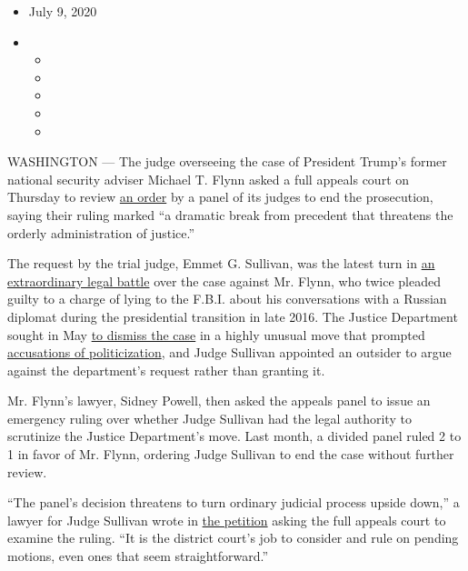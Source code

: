 \begin{itemize}
\item
  July 9, 2020
\item
  \begin{itemize}
  \item
  \item
  \item
  \item
  \item
  \end{itemize}
\end{itemize}

WASHINGTON --- The judge overseeing the case of President Trump's former
national security adviser Michael T. Flynn asked a full appeals court on
Thursday to review
\href{https://www.nytimes.com/2020/06/24/us/politics/michael-flynn-appeals-court.html}{an
order} by a panel of its judges to end the prosecution, saying their
ruling marked ``a dramatic break from precedent that threatens the
orderly administration of justice.''

The request by the trial judge, Emmet G. Sullivan, was the latest turn
in
\href{https://www.nytimes.com/2020/06/28/us/politics/michael-flynn-sidney-powell.html}{an
extraordinary legal battle} over the case against Mr. Flynn, who twice
pleaded guilty to a charge of lying to the F.B.I. about his
conversations with a Russian diplomat during the presidential transition
in late 2016. The Justice Department sought in May
\href{https://www.nytimes.com/2020/05/07/us/politics/michael-flynn-case-dropped.html}{to
dismiss the case} in a highly unusual move that prompted
\href{https://www.nytimes.com/2020/05/08/us/politics/barr-flynn-case-justice-department.html}{accusations
of politicization}, and Judge Sullivan appointed an outsider to argue
against the department's request rather than granting it.

Mr. Flynn's lawyer, Sidney Powell, then asked the appeals panel to issue
an emergency ruling over whether Judge Sullivan had the legal authority
to scrutinize the Justice Department's move. Last month, a divided panel
ruled 2 to 1 in favor of Mr. Flynn, ordering Judge Sullivan to end the
case without further review.

``The panel's decision threatens to turn ordinary judicial process
upside down,'' a lawyer for Judge Sullivan wrote in
\href{https://pacer-documents.s3.amazonaws.com/207/20-05143/01208242956.pdf}{the
petition} asking the full appeals court to examine the ruling. ``It is
the district court's job to consider and rule on pending motions, even
ones that seem straightforward.''

